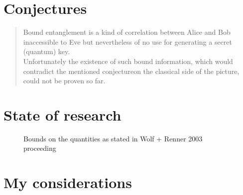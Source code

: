 \section{Conjectures}
		\begin{quotation}
			Bound entanglement is a kind of correlation between Alice and Bob inaccessible to Eve but nevertheless of no use for generating a secret (quantum) key.\\
			Unfortunately the existence of such bound information, which would contradict the mentioned conjecture\footnotemark on the classical side of the picture, could not be proven so far.
		\end{quotation}
		
		
	\section{State of research}
		\begin{figure}[h]
			\centering
			
			\caption{Bounds on the quantities as stated in Wolf + Renner 2003 proceeding}
		\end{figure}
	\section{My considerations}
